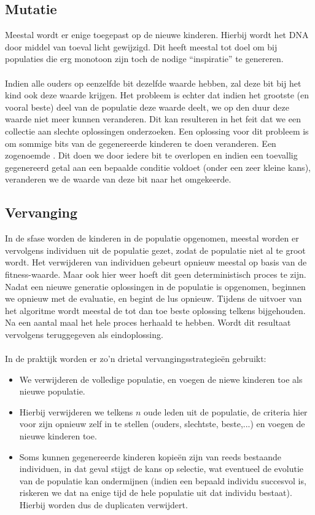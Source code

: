\subsection{Mutatie}Meestal wordt er enige  toegepast op de nieuwe kinderen. Hierbij wordt het DNA door middel van toeval licht gewijzigd. Dit heeft meestal tot doel om bij populaties die erg monotoon zijn toch de nodige ``inspiratie'' te genereren.
\paragraph{}Indien alle ouders op eenzelfde bit dezelfde waarde hebben, zal deze bit bij het kind ook deze waarde krijgen. Het probleem is echter dat indien het grootste (en vooral beste) deel van de populatie deze waarde deelt, we op den duur deze waarde niet meer kunnen veranderen. Dit kan resulteren in het feit dat we een collectie aan slechte oplossingen onderzoeken. Een oplossing voor dit probleem is om sommige bits van de gegenereerde kinderen te doen veranderen. Een zogenoemde . Dit doen we door iedere bit te overlopen en indien een toevallig gegenereerd getal aan een bepaalde conditie voldoet (onder een zeer kleine kans), veranderen we de waarde van deze bit naar het omgekeerde.
\subsection{Vervanging}In de sfase worden de kinderen in de populatie opgenomen, meestal worden er vervolgens individuen uit de populatie gezet, zodat de populatie niet al te groot wordt. Het verwijderen van individuen gebeurt opnieuw meestal op basis van de fitness-waarde. Maar ook hier weer hoeft dit geen deterministisch proces te zijn. Nadat een nieuwe generatie oplossingen in de populatie is opgenomen, beginnen we opnieuw met de evaluatie, en begint de lus opnieuw. Tijdens de uitvoer van het algoritme wordt meestal de tot dan toe beste oplossing telkens bijgehouden. Na een aantal maal het hele proces herhaald te hebben. Wordt dit resultaat vervolgens teruggegeven als eindoplossing.
\paragraph{}In de praktijk worden er zo'n drietal vervangingsstrategie\"en gebruikt:
\begin{itemize}
 \item {} We verwijderen de volledige populatie, en voegen de niewe kinderen toe als nieuwe populatie.
 \item {} Hierbij verwijderen we telkens $n$ oude leden uit de populatie, de criteria hier voor zijn opnieuw zelf in te stellen (ouders, slechtste, beste,...) en voegen de nieuwe kinderen toe.
 \item {} Soms kunnen gegenereerde kinderen kopie\"en zijn van reeds bestaande individuen, in dat geval stijgt de kans op selectie, wat eventueel de evolutie van de populatie kan ondermijnen (indien een bepaald individu succesvol is, riskeren we dat na enige tijd de hele populatie uit dat individu bestaat). Hierbij worden dus de duplicaten verwijdert.
\end{itemize}
